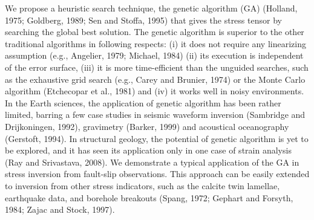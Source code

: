 We propose a heuristic search technique, the genetic algorithm (GA) (Holland, 1975; Goldberg, 1989; Sen and Stoffa, 1995) that gives the stress tensor by searching the global best solution. The genetic algorithm is superior to the other traditional algorithms in following respects: (i) it does not require any linearizing assumption (e.g., Angelier, 1979; Michael, 1984) (ii) its execution is independent of the error surface, (iii) it is more time-efficient than the unguided searches, such as the exhaustive grid search (e.g., Carey and Brunier, 1974) or the Monte Carlo algorithm (Etchecopar et al., 1981) and (iv) it works well in noisy environments. In the Earth sciences, the application of genetic algorithm has been rather limited, barring a few case studies in seismic waveform inversion (Sambridge and Drijkoningen, 1992), gravimetry (Barker, 1999) and acoustical oceanography (Gerstoft, 1994). In structural geology, the potential of genetic algorithm is yet to be explored, and it has seen its application only in one case of strain analysis (Ray and Srivastava, 2008). We demonstrate a typical application of the GA in stress inversion from fault-slip observations. This approach can be easily extended to inversion from other stress indicators, such as the calcite twin lamellae, earthquake data, and borehole breakouts (Spang, 1972; Gephart and Forsyth, 1984; Zajac and Stock, 1997).